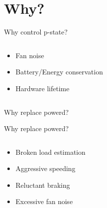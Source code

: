 \documentclass[aspectratio=169]{beamer}
\begin{document}
\section{Why?}

\begin{frame}{Why control p-state?}
\begin{columns}[onlytextwidth]
\begin{column}{0.4\textwidth}
\begin{itemize}
\item<1-> Fan noise
\item<2-> Battery/Energy conservation
\item<3-> Hardware lifetime
\end{itemize}
\end{column}
\begin{column}{0.6\textwidth}
\begin{tikzpicture}[scale=.6]


\end{tikzpicture}
\end{column}
\end{columns}
\end{frame}

\begin{frame}{Why replace powerd?}
\centering
{}
\end{frame}

\begin{frame}{Why replace powerd?}
\begin{columns}[onlytextwidth]
\begin{column}{0.4\textwidth}
\begin{itemize}
\item<1-> Broken load estimation
\item<2-> Aggressive speeding
\item<3-> Reluctant braking
\item<4-> Excessive fan noise
\end{itemize}
\end{column}
\begin{column}{0.6\textwidth}
\begin{tikzpicture}[scale=.6]


\end{tikzpicture}
\end{column}
\end{columns}
\end{frame}
\end{document}
